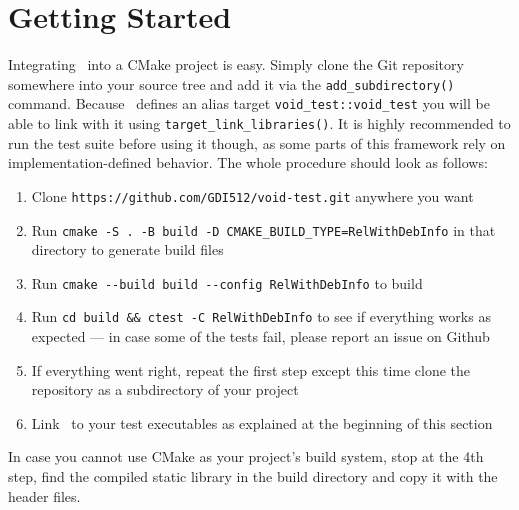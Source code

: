 \section{Getting Started}
Integrating \voidtest\ into a CMake project is easy. Simply clone the Git
repository somewhere into your source tree and add it via the
\verb!add_subdirectory()! command. Because \voidtest\ defines an alias target
\verb!void_test::void_test! you will be able to link with it using
\verb!target_link_libraries()!. It is highly recommended to run the test suite
before using it though, as some parts of this framework rely on
implementation-defined behavior. The whole procedure should look as follows:
\begin{enumerate}
  \item Clone \verb!https://github.com/GDI512/void-test.git! anywhere you want
  \item Run \verb!cmake -S . -B build -D CMAKE_BUILD_TYPE=RelWithDebInfo! in that
  directory to generate build files
  \item Run \verb!cmake --build build --config RelWithDebInfo! to build \voidtest\
  \item Run \verb!cd build && ctest -C RelWithDebInfo! to see if everything works
  as expected --- in case some of the tests fail, please report an issue on Github
  \item If everything went right, repeat the first step except this time clone the
  repository as a subdirectory of your project
  \item Link \voidtest\ to your test executables as explained at the beginning of
  this section
\end{enumerate}
In case you cannot use CMake as your project's build system, stop at the 4th
step, find the compiled static library in the build directory and copy
it with the header files.
